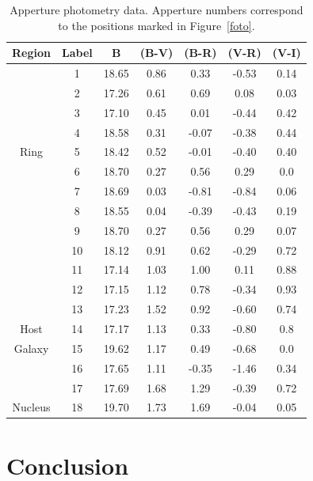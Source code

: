 \documentclass[useAMS,usenatbib]{mn2e}
\begin{document}
\begin{table}
  \begin{center}
    \caption {Apperture photometry data. Apperture numbers correspond to the
positions marked in Figure~\ref{foto}.}
     \label{mag}
    \begin{tabular}{|c|c|c|c|c|c|c|}
      \hline
      \textbf{Region} & \textbf{Label} & \textbf{B} & \textbf{(B-V)} &
\textbf{(B-R)} & \textbf{(V-R)} & \textbf{(V-I)} \\
      \hline
      \hline
	
	&1	&	18.65 &0.86 & 0.33 & -0.53 & 0.14\\
	&2	& 	17.26 &0.61 & 0.69 & 0.08 & 0.03 \\
	& 3	& 	17.10 &0.45 & 0.01 & -0.44 & 0.42\\
	&4	& 	18.58 &0.31 & -0.07 & -0.38 & 0.44 \\	
Ring    &5	& 	18.42 &0.52 & -0.01 & -0.40 & 0.40 \\
	& 6	&	18.70 &0.27 & 0.56 & 0.29 & 0.0 \\
	&7	& 	18.69 &0.03 & -0.81 & -0.84 & 0.06\\	
	&8	& 	18.55 &0.04 & -0.39 & -0.43 & 0.19\\
	&9	& 	18.70 &0.27 & 0.56 & 0.29 & 0.07 \\
	&10	& 	18.12 &0.91 & 0.62 & -0.29 & 0.72 \\

\hline
	&11 & 17.14 &1.03 & 1.00 & 0.11 & 0.88\\
	&12 & 17.15 &1.12 & 0.78 & -0.34 & 0.93 \\
	&13 & 17.23 &1.52 & 0.92 & -0.60 & 0.74 \\
   Host &14 & 17.17 &1.13 & 0.33 & -0.80 & 0.8\\
Galaxy	&15 & 19.62 &1.17 & 0.49 & -0.68 & 0.0 \\
	&16 & 17.65 &1.11 & -0.35 & -1.46 & 0.34\\
	&17 & 17.69 &1.68 & 1.29 & -0.39 & 0.72 \\
\hline
Nucleus &18 & 19.70 &1.73 & 1.69 & -0.04 & 0.05 \\
\hline
    \end{tabular}
  \end{center}
\end{table}


\section{Conclusion} \label{con}
\end{document}
